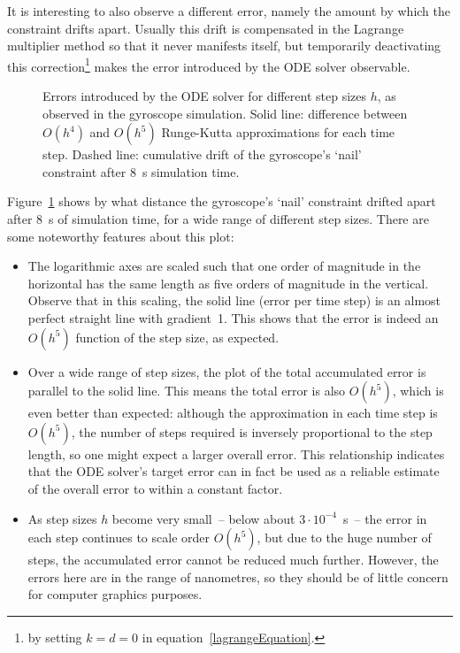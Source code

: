 It is interesting to also observe a different error, namely the amount by which the constraint
drifts apart. Usually this drift is compensated in the Lagrange multiplier method so that it
never manifests itself, but temporarily deactivating this
correction\footnote{by setting $k=d=0$ in equation~\ref{lagrangeEquation}.} makes the error
introduced by the ODE solver observable.

\begin{figure}
\centerline{}
\caption{Errors introduced by the ODE solver for different step sizes $h$, as observed in the
    gyroscope simulation.
    Solid line: difference between $O(h^4)$ and $O(h^5)$ Runge-Kutta approximations for each time
    step. Dashed line: cumulative drift of the gyroscope's `nail' constraint after 8~s simulation
    time.\label{errorplot}}
\end{figure}

Figure~\ref{errorplot} shows by what distance the gyroscope's `nail' constraint drifted apart
after 8~s of simulation time, for a wide range of different step sizes. There are some noteworthy
features about this plot:

\begin{itemize}
\item The logarithmic axes are scaled such that one order of magnitude in the horizontal has the
    same length as five orders of magnitude in the vertical. Observe that in this scaling, the
    solid line (error per time step) is an almost perfect straight line with gradient~1. This
    shows that the error is indeed an $O(h^5)$ function of the step size, as expected.
\item Over a wide range of step sizes, the plot of the total accumulated error is parallel to the
    solid line. This means the total error is also $O(h^5)$, which is even better than
    expected: although the approximation in each time step is $O(h^5)$, the number of steps
    required is inversely proportional to the step length, so one might expect a larger overall
    error. This relationship indicates that the ODE solver's target error can in fact be used
    as a reliable estimate of the overall error to within a constant factor.
\item As step sizes $h$ become very small~-- below about $3\cdot 10^{-4}$~s~-- the error in each
    step continues to scale order $O(h^5)$, but due to the huge number of steps, the accumulated
    error cannot be reduced much further. However, the errors here are in the range of nanometres,
    so they should be of little concern for computer graphics purposes.
\end{itemize}

